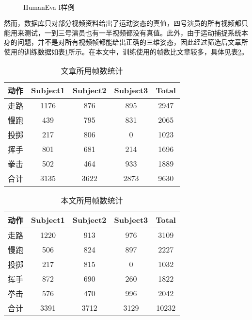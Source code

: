 \begin{figure}[htbp]
  \centering
  \\
  \caption{HumanEva-I样例}\label{fig:demo}
\end{figure}

然而，数据库只对部分视频资料给出了运动姿态的真值，四号演员的所有视频都只能用来测试，一到三号演员也有一半视频都没有真值。此外，由于运动捕捉系统本身的问题，并不是对所有视频帧都能给出正确的三维姿态，因此经过筛选后\cite{Poppe2007}\cite{bo2010twin}文章所使用的训练数据如表\ref{tab:poppe}所示。在本文中，训练使用的帧数比\cite{Poppe2007}\cite{bo2010twin}文章较多，具体见表\ref{tab:mydataset}。

\begin{table}[htbp]
  \centering
  \caption{\cite{Poppe2007}\cite{bo2010twin}文章所用帧数统计}
  \label{tab:poppe}
    \begin{tabular}{lcccc}
      \toprule[1.5pt]
      动作 & Subject1 & Subject2 & Subject3 & Total \\\midrule[1pt]
      走路 & 1176 & 876 & 895 & 2947 \\
      慢跑 & 439 & 795 & 831 & 2065 \\
      投掷 & 217 & 806 & 0 & 1023\\
      挥手 & 801 & 681 & 214 & 1696\\
      拳击 & 502 & 464 & 933 & 1889\\
      合计 & 3135 & 3622 & 2873 & 9630\\
      \bottomrule[1.5pt]
    \end{tabular}
\end{table}

\begin{table}[htbp]
  \centering
  \caption{本文所用帧数统计}
  \label{tab:mydataset}
    \begin{tabular}{lcccc}
      \toprule[1.5pt]
      动作 & Subject1 & Subject2 & Subject3 & Total \\\midrule[1pt]
      走路 & 1220 & 913 & 976 & 3109 \\
      慢跑 & 506 & 824 & 897 & 2227 \\
      投掷 & 217 & 815 & 0 & 1032\\
      挥手 & 872 & 690 & 260 & 1822\\
      拳击 & 576 & 470 & 996 & 2042\\
      合计 & 3391 & 3712 & 3129 & 10232\\
      \bottomrule[1.5pt]
    \end{tabular}
\end{table}



